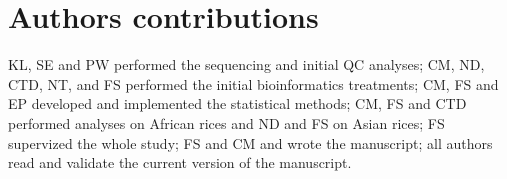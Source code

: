 \documentclass[10pt,letterpaper]{article}
\begin{document}
\section*{Authors contributions}
KL, SE and PW performed the sequencing and initial QC analyses; CM, ND, CTD, NT, and FS performed the initial bioinformatics treatments; CM, FS and EP developed and implemented the statistical methods; CM, FS and CTD performed analyses on African rices and ND and FS on Asian rices; FS supervized the whole study; FS and CM and wrote the manuscript; all authors read and validate the current version of the manuscript.


\nolinenumbers

% 
% 
\end{document}
